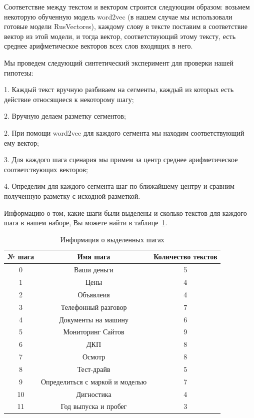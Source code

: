\documentclass[12pt]{article}
\begin{document}
Соответствие между текстом и вектором строится следующим образом: возьмем некоторую обученную модель word2vec (в нашем случае мы использовали готовые модели RusVectores), каждому слову в тексте поставим в соответствие вектор из этой модели, и тогда вектор, соответствующий этому тексту, есть среднее арифметическое векторов всех слов входящих в него.

Мы проведем следующий синтетический эксперимент для проверки нашей гипотезы:

1. Каждый текст вручную разбиваем на сегменты, каждый из которых есть действие относящиеся к некоторому шагу;

2. Вручную делаем разметку сегментов;

2. При помощи word2vec для каждого сегмента мы находим соответствующий ему вектор;

3.  Для каждого шага сценария мы примем за центр среднее арифметическое соответствующих векторов;

4. Определим для каждого сегмента шаг по ближайшему центру и сравним полученную разметку с исходной разметкой.

Информацию о том, какие шаги были выделены и сколько текстов для каждого шага в нашем наборе, Вы можете найти в таблице~\ref{table:2.0}.

\begin{table}[h!]
\centering
\begin{tabular}{||c|c|c||} 
 \hline
 № шага & Имя шага &Количество текстов\\
 \hline
 0&  Ваши деньги&5\\ 
 1&  Цены&4  \\ 
 2&  Объявлеия&4  \\ 
 3&  Телефонный разговор&7  \\ 
  4&  Документы на машину&6  \\ 
 5&  Мониторинг Сайтов&9\\ 
 6&  ДКП&8  \\ 
 7&  Осмотр&8  \\ 
 8&  Тест-драйв&5  \\ 
 9&  Определиться с маркой и моделью&7  \\ 
 10&  Дигностика&4  \\ 
 11&  Год выпуска и пробег&3  \\ 
 \hline
\end{tabular}
\caption{Информация о выделенных шагах}
\label{table:2.0}
\end{table}
\end{document}
